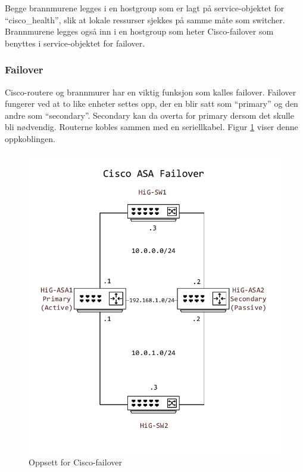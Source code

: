 Begge brannmurene legges i en hostgroup som er lagt på service-objektet for ``cisco\_health'', slik at lokale ressurser sjekkes på samme måte som switcher. Brannmurene legges også inn i en hostgroup som heter Cisco-failover som benyttes i service-objektet for failover.

\subsubsection{Failover}
Cisco-routere og brannmurer har en viktig funksjon som kalles failover. Failover fungerer ved at to like enheter settes opp, der en blir satt som ``primary'' og den andre som ``secondary''. Secondary kan da overta for primary dersom det skulle bli nødvendig. Routerne kobles sammen med en seriellkabel. Figur \ref{ciscoasafailover} viser denne oppkoblingen. 

\begin{figure}[H]
    \centering
    \includegraphics[scale=0.6]{img/asafailover}
    \caption{Oppsett for Cisco-failover}
    \label{ciscoasafailover}
\end{figure}

